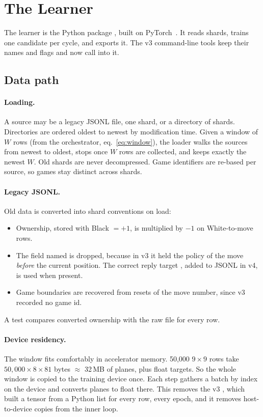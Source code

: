 \section{The Learner}\label{sec:learner}

The learner is the Python package , built on
PyTorch~\citep{paszke2019pytorch}. It reads shards, trains one candidate per cycle, and
exports it. The v3 command-line tools keep their names and flags and now call into it.

\subsection{Data path}\label{sec:learner-data}

\paragraph{Loading.}
A source may be a legacy JSONL file, one shard, or a directory of shards. Directories are
ordered oldest to newest by modification time. Given a window of $W$ rows (from the
orchestrator, eq.~\eqref{eq:window}), the loader walks the sources from newest to oldest,
stops once $W$ rows are collected, and keeps exactly the newest $W$. Old shards are never
decompressed. Game identifiers are re-based per source, so games stay distinct across
shards.

\paragraph{Legacy JSONL.}
Old data is converted into shard conventions on load:
\begin{itemize}
  \item Ownership, stored with Black $=+1$, is multiplied by $-1$ on White-to-move rows.
  \item The field named  is dropped, because in v3 it held the policy of
        the move \emph{before} the current position. The correct reply target
        , added to JSONL in v4, is used when present.
  \item Game boundaries are recovered from resets of the move number, since v3 recorded
        no game id.
\end{itemize}
A test compares converted ownership with the raw file for every row.

\paragraph{Device residency.}
The window fits comfortably in accelerator memory. 50{,}000 $9\times9$ rows take
$50{,}000\times8\times81$ bytes $\approx$ 32\,MB of  planes, plus float
targets. So the whole window is copied to the training device once. Each step gathers a
batch by index on the device and converts planes to float there. This removes the v3
, which built a tensor from a Python list for every row, every epoch, and
it removes host-to-device copies from the inner loop.

